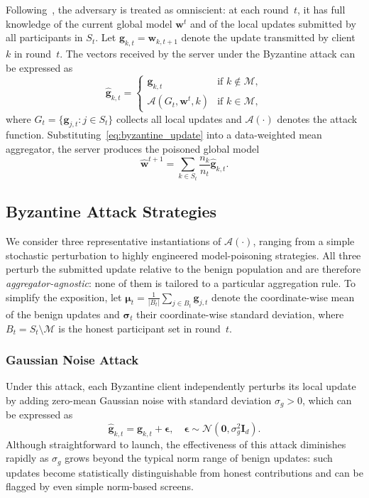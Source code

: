 \documentclass[journal]{IEEEtran}
\begin{document}
Following~\cite{shejwalkar2021manipulating, baruch2019little}, the adversary is treated as omniscient: at each round~$t$, it has full knowledge of the current global model $\mathbf{w}^t$ and of the local updates submitted by all participants in $S_t$. Let $\mathbf{g}_{k,t} = \mathbf{w}_{k,t+1}$ denote the update transmitted by client~$k$ in round~$t$. The vectors received by the server under the Byzantine attack can be expressed as
\begin{equation}
\hat{\mathbf{g}}_{k,t} =
\begin{cases}
\mathbf{g}_{k,t} & \text{if } k \notin \mathcal{M}, \\
\mathcal{A}(G_t, \mathbf{w}^t, k) & \text{if } k \in \mathcal{M},
\end{cases}
\label{eq:byzantine_update}
\end{equation}
where $G_t = \{\mathbf{g}_{j,t} : j \in S_t\}$ collects all local updates and $\mathcal{A}(\cdot)$ denotes the attack function. Substituting~\eqref{eq:byzantine_update} into a data-weighted mean aggregator, the server produces the poisoned global model
\begin{equation}
\hat{\mathbf{w}}^{t+1} = \sum_{k \in S_t} \frac{n_k}{n_t} \hat{\mathbf{g}}_{k,t}.
\label{eq:poisoned_agg}
\end{equation}

\subsection{Byzantine Attack Strategies}

We consider three representative instantiations of $\mathcal{A}(\cdot)$, ranging from a simple stochastic perturbation to highly engineered model-poisoning strategies. All three perturb the submitted update relative to the benign population and are therefore \emph{aggregator-agnostic}: none of them is tailored to a particular aggregation rule. To simplify the exposition, let $\boldsymbol{\mu}_t = \frac{1}{|B_t|} \sum_{j \in B_t} \mathbf{g}_{j,t}$ denote the coordinate-wise mean of the benign updates and $\boldsymbol{\sigma}_t$ their coordinate-wise standard deviation, where $B_t = S_t \setminus \mathcal{M}$ is the honest participant set in round~$t$.

\subsubsection{Gaussian Noise Attack}
Under this attack, each Byzantine client independently perturbs its local update by adding zero-mean Gaussian noise with standard deviation $\sigma_g > 0$, which can be expressed as
\begin{equation}
\hat{\mathbf{g}}_{k,t} = \mathbf{g}_{k,t} + \boldsymbol{\epsilon}, \quad \boldsymbol{\epsilon} \sim \mathcal{N}(\mathbf{0}, \sigma_g^2 \mathbf{I}_d).
\label{eq:gaussian_attack}
\end{equation}
Although straightforward to launch, the effectiveness of this attack diminishes rapidly as $\sigma_g$ grows beyond the typical norm range of benign updates: such updates become statistically distinguishable from honest contributions and can be flagged by even simple norm-based screens.
\end{document}

